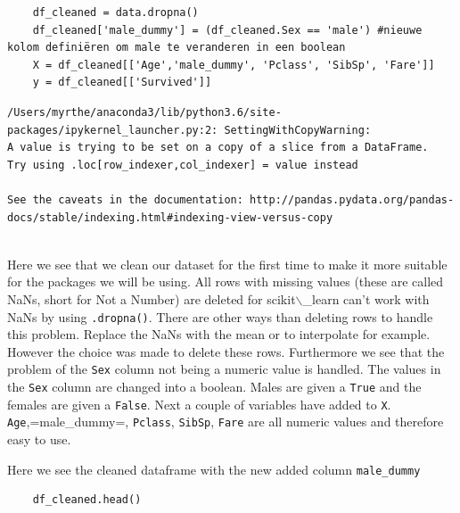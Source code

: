 \documentclass[11pt]{article}
\begin{document}
\begin{verbatim}
    df_cleaned = data.dropna()
    df_cleaned['male_dummy'] = (df_cleaned.Sex == 'male') #nieuwe kolom definiëren om male te veranderen in een boolean
    X = df_cleaned[['Age','male_dummy', 'Pclass', 'SibSp', 'Fare']]
    y = df_cleaned[['Survived']]
\end{verbatim}

\begin{verbatim}
/Users/myrthe/anaconda3/lib/python3.6/site-packages/ipykernel_launcher.py:2: SettingWithCopyWarning: 
A value is trying to be set on a copy of a slice from a DataFrame.
Try using .loc[row_indexer,col_indexer] = value instead

See the caveats in the documentation: http://pandas.pydata.org/pandas-docs/stable/indexing.html#indexing-view-versus-copy
  

\end{verbatim}

Here we see that we clean our dataset for the first time to make it more
suitable for the packages we will be using. All rows with missing values
(these are called NaNs, short for Not a Number) are deleted for
scikit$\backslash$\_learn can't work with NaNs by using \texttt{.dropna()}. There are other
ways than deleting rows to handle this problem. Replace the NaNs with
the mean or to interpolate for example. However the choice was made to
delete these rows. Furthermore we see that the problem of the \texttt{Sex}
column not being a numeric value is handled. The values in the \texttt{Sex}
column are changed into a boolean. Males are given a \texttt{True} and the
females are given a \texttt{False}. Next a couple of variables have added to
\texttt{X}. \texttt{Age},=male\_dummy=, \texttt{Pclass}, \texttt{SibSp}, \texttt{Fare} are all numeric
values and therefore easy to use.

Here we see the cleaned dataframe with the new added column \texttt{male\_dummy}

\begin{verbatim}
    df_cleaned.head()
\end{verbatim}
\end{document}
